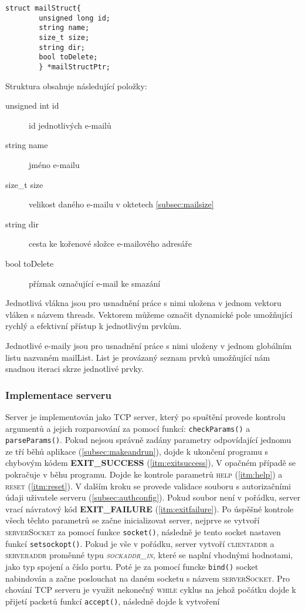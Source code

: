 \documentclass[11pt,a4paper]{report}
\begin{document}
    \lstset{language=C++,frameround=fttt}
    \begin{lstlisting}[frame=trBL]
        struct mailStruct{
        unsigned long id;
        string name;
        size_t size;
        string dir;
        bool toDelete;
        } *mailStructPtr;
    \end{lstlisting}
    Struktura obsahuje následující položky:
    \begin{description}
        \item [unsigned int id] id jednotlivých e-mailů
        \item [string name] jméno e-mailu
        \item [size\_t size] velikost daného e-mailu v oktetech \ref{subsec:mailsize}
        \item [string dir] cesta ke kořenové složce e-mailového adresáře
        \item [bool toDelete] příznak označující e-mail ke smazání
    \end{description}
    Jednotlivá vlákna jsou pro usnadnění práce s nimi uložena v jednom vektoru vláken s názvem threads. Vektorem můžeme označit dynamické pole umožňující rychlý a efektivní přístup k jednotlivým prvkům.\par
    Jednotlivé e-maily jsou pro usnadnění práce s nimi uloženy v jednom globálním listu nazvaném mailList. List je provázaný seznam prvků umožňující nám snadnou iteraci skrze jednotlivé prvky.
    \subsubsection{Implementace serveru}
    \label{subsec:serverimplementation}
    Server je implementován jako TCP server, který po spuštění provede kontrolu argumentů a jejich rozparsování za pomocí funkcí: \texttt{checkParams()} a \texttt{parseParams()}. Pokud nejsou správně zadány parametry odpovídající jednomu ze tří běhů aplikace (\ref{subsec:makeandrun}), dojde k ukončení programu s chybovým kódem \textbf{EXIT\_SUCCESS} (\ref{itm:exitsuccess}), V opačném případě se pokračuje v běhu programu. Dojde ke kontrole parametrů \textsc{help} (\ref{itm:help}) a \textsc{reset} (\ref{itm:reset}). V dalším kroku se provede validace souboru s autorizačními údaji uživatele serveru (\ref{subsec:authconfig}). Pokud soubor není v pořádku, server vrací návratový kód \textbf{EXIT\_FAILURE} (\ref{itm:exitfailure}). Po úspěšné kontrole všech těchto parametrů se začne inicializovat server, nejprve se vytvoří \textsc{serverSocket} za pomocí funkce \texttt{socket()}, následně je tento socket nastaven funkcí \texttt{setsockopt()}. Pokud je vše v pořádku, server vytvoří \textsc{clientaddr} a \textsc{serveraddr} proměnné typu \textit{\textsc{sockaddr\_in}}, které se naplní vhodnými hodnotami, jako typ spojení a číslo portu. Poté je za pomocí funcke \texttt{bind()} socket nabindován a začne poslouchat na daném socketu s názvem \textsc{serverSocket}.
    Pro chování TCP serveru je využit nekonečný \textsc{while} cyklus na jehož počátku dojde k přijetí packetů funkcí \texttt{accept()}, následně dojde k vytvoření
\end{document}
